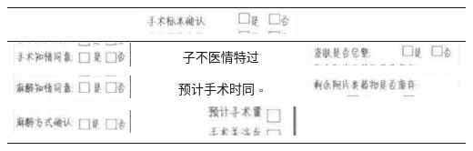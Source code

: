 \documentclass[10pt]{article}
\begin{document}
\begin{center}
\begin{tabular}{|c|c|c|}
 & \includegraphics[max width=\textwidth]{2024_07_05_645bb794a4d4f32ee0c8g-080(12)}
 \\
\hline
\includegraphics[max width=\textwidth]{2024_07_05_645bb794a4d4f32ee0c8g-080(30)}
 & 子不医情特过 & \includegraphics[max width=\textwidth]{2024_07_05_645bb794a4d4f32ee0c8g-080(21)}
 \\
\hline
\includegraphics[max width=\textwidth]{2024_07_05_645bb794a4d4f32ee0c8g-080(18)}
 & 预计手术时同 $\square$ & \includegraphics[max width=\textwidth]{2024_07_05_645bb794a4d4f32ee0c8g-080(9)}
 \\
\hline
\includegraphics[max width=\textwidth]{2024_07_05_645bb794a4d4f32ee0c8g-080(10)}
 & \includegraphics[max width=\textwidth]{2024_07_05_645bb794a4d4f32ee0c8g-080(26)}

\end{tabular}
\end{center}
\end{document}
